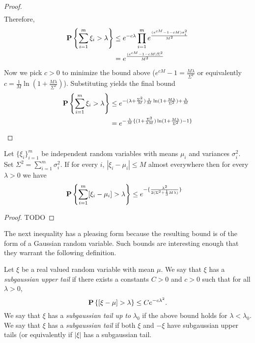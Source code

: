 \begin{proof}
\begin{align*}
\end{align*}
Therefore,
\begin{align*}
\textbf{P}\left \{\sum_{i=1}^m \xi_i > \lambda \right \} &\leq e^{-c\lambda} \prod_{i=1}^m
e^{\frac{(e^{cM} -1 - cM)\sigma_i^2}{M^2}} \\
& = e^{\frac{(e^{cM} -1 - cM)\Sigma^2}{M^2}}
\end{align*}
Now we pick $c>0$ to minimize the bound above ($e^{cM} -1 =
\frac{M\lambda}{\Sigma^2}$ or equivalently $c = \frac{1}{M}\ln(1 + \frac{M\lambda}{\Sigma^2})$).
Substituting yields the final bound
\begin{align*}
\textbf{P}\left \{\sum_{i=1}^m \xi_i > \lambda \right \} &\leq e^{-(\lambda + \frac{\Sigma^2}{M})
  \frac{1}{M}\ln(1 + \frac{M\lambda}{\Sigma^2}) + \frac{\lambda}{M}}
\\
& = e^{-\frac{\lambda}{M} \{
  (1+\frac{\Sigma^2}{\lambda M}) \ln(1 + \frac{M\lambda}{\Sigma^2}) -1
\}}
\end{align*}
\end{proof}

\begin{lem}\label{Bernstein} Let
  $\{\xi_i\}_{i=1}^m$ be independent random variables with means
  $\mu_i$ and variances $\sigma^2_i$.  Set $\Sigma^2 = \sum_{i=1}^m
  \sigma_i^2$.  If for every $i$, $|\xi_i - \mu_i| \leq M$ almost
  everywhere then for every $\lambda > 0$ we have 
\begin{align*}
\textbf{P}\left \{\sum_{i=1}^m [\xi_i - \mu_i] > \lambda \right \} &\leq 
e^{
	-\{\frac{\lambda^2}{2(\Sigma^2 + \frac{1}{3}M\lambda)}\}
}
\end{align*}
\end{lem}
\begin{proof}
TODO
\end{proof}

The next inequality has a pleasing form because the resulting bound is
of the form of a Gaussian random variable.  Such bounds are
interesting enough that they warrant the following definition.
\begin{defn} Let $\xi$ be a real valued random variable with mean
  $\mu$.  We say that $\xi$ has a \emph{subgaussian upper tail} if there
  exists a  constants $C > 0$ and $c > 0$ such that for all $\lambda > 0$,
$$
\textbf{P}\left \{[\xi-\mu] > \lambda \right \} \leq Ce^{-c\lambda^2}.
$$
We say that $\xi$ has a \emph{subgaussian tail up to} $\lambda_0$ if the
above bound holds for $\lambda < \lambda_0$.  We say that $\xi$ has a
\emph{subgaussian tail} if both $\xi$ and $-\xi$ have subgaussian upper
tails (or equivalently if $|\xi|$ has a subgaussian tail.
\end{defn}

